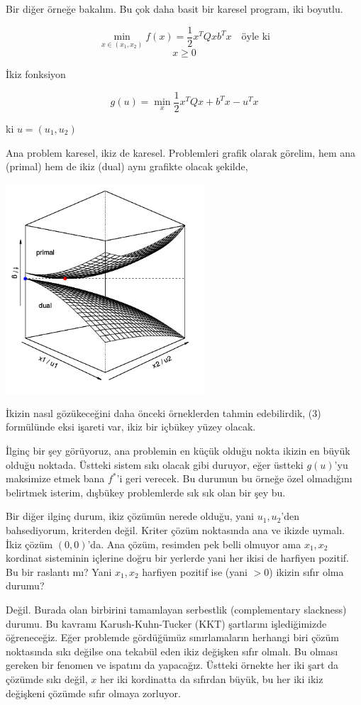\documentclass[12pt,fleqn]{article}\usepackage{../../common}
\begin{document}
Bir diğer örneğe bakalım. Bu çok daha basit bir karesel program, iki
boyutlu. 

$$
\min_{x \in (x_1,x_2)} f(x) = \frac{1}{2} x^T Q x b^T x \quad \textrm{öyle ki}
$$
$$
x \ge 0
$$

İkiz fonksiyon

$$
g(u) = \min_x \frac{1}{2} x^T Q x + b^T x - u^T x 
$$

ki $u = (u_1,u_2)$

Ana problem karesel, ikiz de karesel. Problemleri grafik olarak görelim,
hem ana (primal) hem de ikiz (dual) aynı grafikte olacak şekilde,

\includegraphics[width=20em]{func_56_gendual_03.png}

İkizin nasıl gözükeceğini daha önceki örneklerden tahmin edebilirdik, (3)
formülünde eksi işareti var, ikiz bir içbükey yüzey olacak.

İlginç bir şey görüyoruz, ana problemin en küçük olduğu nokta ikizin en
büyük olduğu noktada. Üstteki sistem sıkı olacak gibi duruyor, eğer üstteki
$g(u)$'yu maksimize etmek bana $f^*$'i geri verecek.  Bu durumun bu örneğe
özel olmadığını belirtmek isterim, dışbükey problemlerde sık sık olan bir
şey bu. 

Bir diğer ilginç durum, ikiz çözümün nerede olduğu, yani $u_1,u_2$'den
bahsediyorum, kriterden değil. Kriter çözüm noktasında ana ve ikizde
uymalı. İkiz çözüm $(0,0)$'da. Ana çözüm, resimden pek belli olmuyor ama
$x_1,x_2$ kordinat sisteminin içlerine doğru bir yerlerde yani her ikisi de
harfiyen pozitif. Bu bir raslantı mı? Yani $x_1,x_2$ harfiyen pozitif ise
(yani $>0$) ikizin sıfır olma durumu? 

Değil. Burada olan birbirini tamamlayan serbestlik (complementary
slackness) durumu. Bu kavramı Karush-Kuhn-Tucker (KKT) şartlarını
işlediğimizde öğreneceğiz. Eğer problemde gördüğümüz sınırlamaların
herhangi biri çözüm noktasında sıkı değilse ona tekabül eden ikiz değişken
sıfır olmalı. Bu olması gereken bir fenomen ve ispatını da yapacağız.
Üstteki örnekte her iki şart da çözümde sıkı değil, $x$ her iki kordinatta
da sıfırdan büyük, bu her iki ikiz değişkeni çözümde sıfır olmaya zorluyor.
\end{document}
